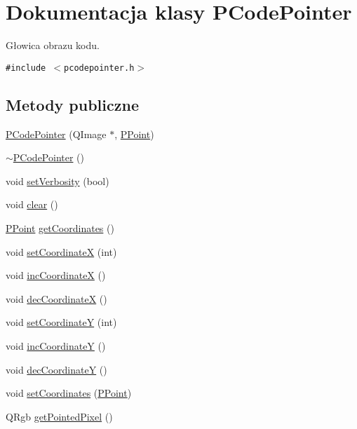 \hypertarget{classPCodePointer}{
\section{Dokumentacja klasy PCodePointer}
\label{classPCodePointer}
}
Głowica obrazu kodu.  


{\tt \#include $<$pcodepointer.h$>$}

\subsection*{Metody publiczne}
\begin{CompactItemize}
\item 
\hyperlink{classPCodePointer_cd5cd1cd86ff9cf89ac6d2aae5cb52d8}{PCodePointer} (QImage $\ast$, \hyperlink{structstruct__point}{PPoint})
\item 
\hyperlink{classPCodePointer_dc12b4bda6ed4b1045b0767b41ff2efa}{$\sim$PCodePointer} ()
\item 
void \hyperlink{classPCodePointer_d738019c8cb766c0863e2c00622d9fc9}{setVerbosity} (bool)
\item 
void \hyperlink{classPCodePointer_fb47282905de53ad98a0c3d76dbd0fb0}{clear} ()
\item 
\hyperlink{structstruct__point}{PPoint} \hyperlink{classPCodePointer_c792e5bc527542482542ed22acc9cca4}{getCoordinates} ()
\item 
void \hyperlink{classPCodePointer_9bcf58c97f704e3be2deefb588f91312}{setCoordinateX} (int)
\item 
void \hyperlink{classPCodePointer_ef8324dbdca82baa094e47e36f978669}{incCoordinateX} ()
\item 
void \hyperlink{classPCodePointer_3b98e9637236aa9d975dc59c0397e625}{decCoordinateX} ()
\item 
void \hyperlink{classPCodePointer_9fd77f14e39cc30f8cfc583ce97aa2f2}{setCoordinateY} (int)
\item 
void \hyperlink{classPCodePointer_58c15d4d1abb1fb971170f19c3b9e8cf}{incCoordinateY} ()
\item 
void \hyperlink{classPCodePointer_cc8b95bb3786748c1aff41eed6d299e1}{decCoordinateY} ()
\item 
void \hyperlink{classPCodePointer_117bf9322b4fdcb189c41a6f2f113a4b}{setCoordinates} (\hyperlink{structstruct__point}{PPoint})
\item 
QRgb \hyperlink{classPCodePointer_6544ee43112dcafb5fc7c865ced682f0}{getPointedPixel} ()
\item 

\end{CompactItemize}
